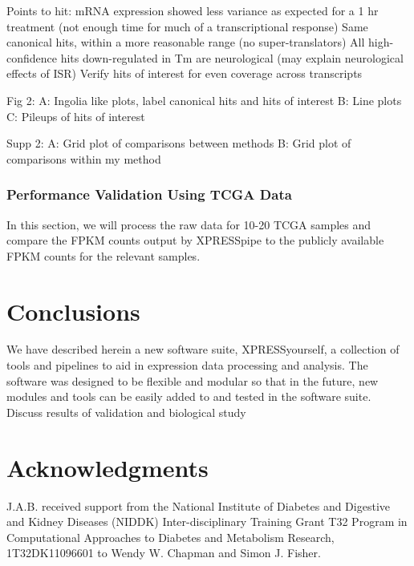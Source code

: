 \documentclass[11pt, a4paper, oneside]{article}
\begin{document}
Points to hit:
mRNA expression showed less variance as expected for a 1 hr treatment (not enough time for much of a transcriptional response)
Same canonical hits, within a more reasonable range (no super-translators)
All high-confidence hits down-regulated in Tm are neurological (may explain neurological effects of ISR)
Verify hits of interest for even coverage across transcripts

Fig 2:
A: Ingolia like plots, label canonical hits and hits of interest
B: Line plots
C: Pileups of hits of interest

Supp 2:
A: Grid plot of comparisons between methods
B: Grid plot of comparisons within my method




\subsubsection{Performance Validation Using TCGA Data}
In this section, we will process the raw data for 10-20 TCGA samples and compare the FPKM counts output by XPRESSpipe to the publicly available FPKM counts for the relevant samples.


\section{Conclusions}
We have described herein a new software suite, XPRESSyourself, a collection of tools and pipelines to aid in expression data processing and analysis. The software was designed to be flexible and modular so that in the future, new modules and tools can be easily added to and tested in the software suite.
Discuss results of validation and biological study


\section*{Acknowledgments}
J.A.B. received support from the National Institute of Diabetes and Digestive and Kidney Diseases (NIDDK) Inter-disciplinary Training Grant T32 Program in Computational Approaches to Diabetes and Metabolism Research, 1T32DK11096601 to Wendy W. Chapman and Simon J. Fisher.
\end{document}

